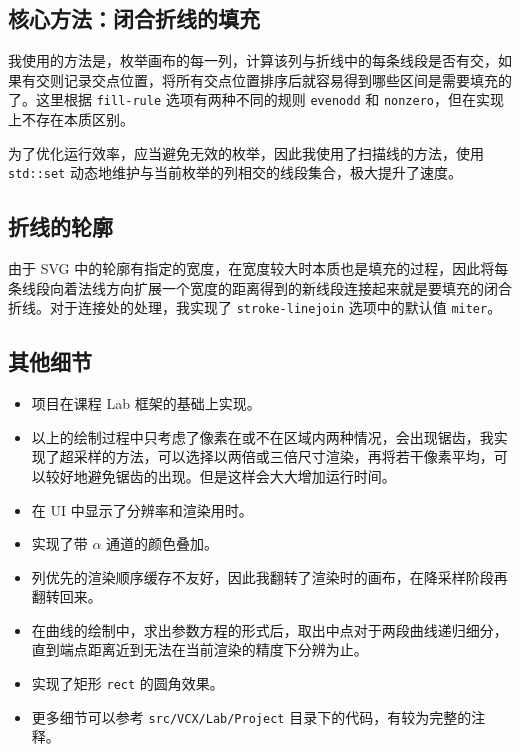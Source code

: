 \documentclass[UTF8]{ctexart}
\begin{document}
\subsection{核心方法：闭合折线的填充}

我使用的方法是，枚举画布的每一列，计算该列与折线中的每条线段是否有交，如果有交则记录交点位置，将所有交点位置排序后就容易得到哪些区间是需要填充的了。这里根据 \texttt{fill-rule} 选项有两种不同的规则 \texttt{evenodd} 和 \texttt{nonzero}，但在实现上不存在本质区别。

为了优化运行效率，应当避免无效的枚举，因此我使用了扫描线的方法，使用 \texttt{std::set} 动态地维护与当前枚举的列相交的线段集合，极大提升了速度。

\subsection{折线的轮廓}

由于 SVG 中的轮廓有指定的宽度，在宽度较大时本质也是填充的过程，因此将每条线段向着法线方向扩展一个宽度的距离得到的新线段连接起来就是要填充的闭合折线。对于连接处的处理，我实现了 \texttt{stroke-linejoin} 选项中的默认值 \texttt{miter}。

\subsection{其他细节}

\begin{itemize}
    \item 项目在课程 Lab 框架的基础上实现。
    \item 以上的绘制过程中只考虑了像素在或不在区域内两种情况，会出现锯齿，我实现了超采样的方法，可以选择以两倍或三倍尺寸渲染，再将若干像素平均，可以较好地避免锯齿的出现。但是这样会大大增加运行时间。
    \item 在 UI 中显示了分辨率和渲染用时。
    \item 实现了带 $\alpha$ 通道的颜色叠加。
    \item 列优先的渲染顺序缓存不友好，因此我翻转了渲染时的画布，在降采样阶段再翻转回来。
    \item 在曲线的绘制中，求出参数方程的形式后，取出中点对于两段曲线递归细分，直到端点距离近到无法在当前渲染的精度下分辨为止。
    \item 实现了矩形 \texttt{rect} 的圆角效果。
    \item 更多细节可以参考 \texttt{src/VCX/Lab/Project} 目录下的代码，有较为完整的注释。
\end{itemize}
\end{document}
